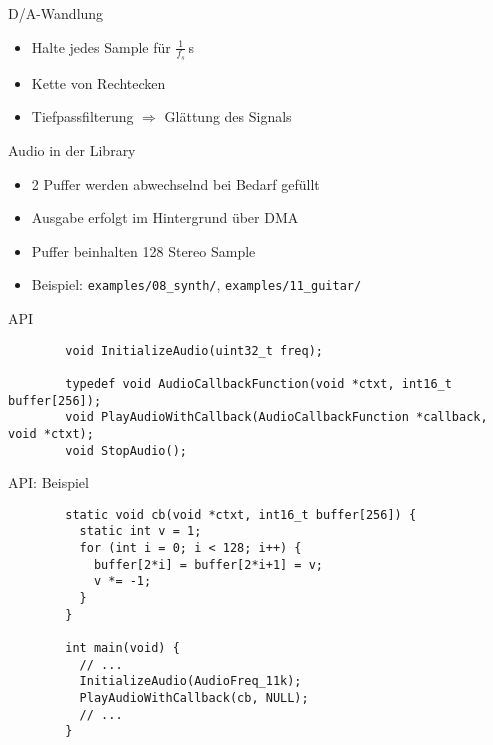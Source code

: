 \documentclass[ngerman,compress]{beamer}
\begin{document}
\begin{frame}{D/A-Wandlung}
	\begin{itemize}
		\item Halte jedes Sample für $\frac{1}{f_s}$\,\si{\second}
		\item Kette von Rechtecken
		\item Tiefpassfilterung $\Rightarrow$ Glättung des Signals
	\end{itemize}
\end{frame}

\begin{frame}[fragile]{Audio in der Library}
	\begin{itemize}
		\item 2 Puffer werden abwechselnd bei Bedarf gefüllt
		\item Ausgabe erfolgt im Hintergrund über DMA
		\item Puffer beinhalten 128 Stereo Sample
		\item Beispiel: \verb|examples/08_synth/|, \verb|examples/11_guitar/|
	\end{itemize}
\end{frame}

\begin{frame}[fragile]{API}
	\begin{lstlisting}
		void InitializeAudio(uint32_t freq);

		typedef void AudioCallbackFunction(void *ctxt, int16_t buffer[256]);
		void PlayAudioWithCallback(AudioCallbackFunction *callback, void *ctxt);
		void StopAudio();
	\end{lstlisting}
\end{frame}

\begin{frame}[fragile]{API: Beispiel}
	\begin{lstlisting}
		static void cb(void *ctxt, int16_t buffer[256]) {
		  static int v = 1;
		  for (int i = 0; i < 128; i++) {
		    buffer[2*i] = buffer[2*i+1] = v;
		    v *= -1;
		  }
		}

		int main(void) {
		  // ...
		  InitializeAudio(AudioFreq_11k);
		  PlayAudioWithCallback(cb, NULL);
		  // ...
		}
	\end{lstlisting}
\end{frame}
\end{document}

